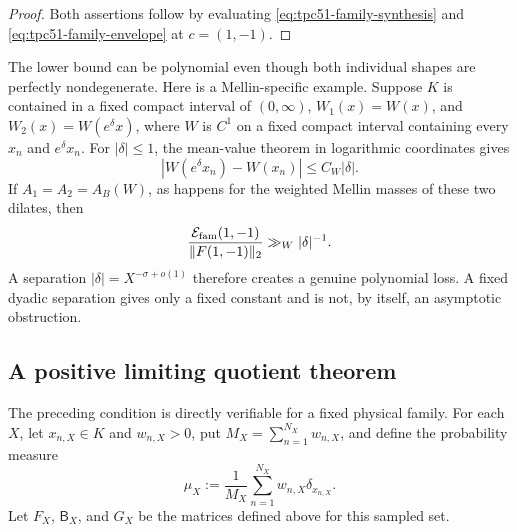 \begin{proof}
Both assertions follow by evaluating
\eqref{eq:tpc51-family-synthesis} and
\eqref{eq:tpc51-family-envelope} at \(c=(1,-1)\).
\end{proof}

The lower bound can be polynomial even though both individual shapes
are perfectly nondegenerate.  Here is a Mellin-specific example.
Suppose \(K\) is contained in a fixed compact interval of
\((0,\infty)\), \(W_1(x)=W(x)\), and
\(W_2(x)=W(e^\delta x)\), where \(W\) is \(C^1\) on a fixed compact
interval containing every \(x_n\) and \(e^\delta x_n\).  For
\(|\delta|\le1\), the mean-value theorem in logarithmic coordinates
gives
\begin{equation}
 |W(e^\delta x_n)-W(x_n)|
 \le C_W|\delta|.
 \label{eq:tpc51-dilation-near-duplicate}
\end{equation}
If \(A_1=A_2=A_B(W)\), as happens for the weighted Mellin masses of
these two dilates, then
\begin{equation}
 \frac{\mathcal E_{\mathrm{fam}}(1,-1)}
      {\|F(1,-1)\|_2}
 \gg_W |\delta|^{-1}.
 \label{eq:tpc51-dilation-condition}
\end{equation}
A separation \(|\delta|=X^{-\sigma+o(1)}\) therefore creates a genuine
polynomial loss.  A fixed dyadic separation gives only a fixed constant
and is not, by itself, an asymptotic obstruction.

\subsection{A positive limiting quotient theorem}

The preceding condition is directly verifiable for a fixed physical
family.  For each \(X\), let \(x_{n,X}\in K\) and \(w_{n,X}>0\), put
\(M_X=\sum_{n=1}^{N_X}w_{n,X}\), and define the probability measure
\begin{equation}
 \mu_X:=\frac1{M_X}\sum_{n=1}^{N_X}w_{n,X}\delta_{x_{n,X}}.
 \label{eq:tpc51-family-empirical-measure}
\end{equation}
Let \(F_X\), \(\mathsf B_X\), and \(G_X\) be the matrices defined
above for this sampled set.


